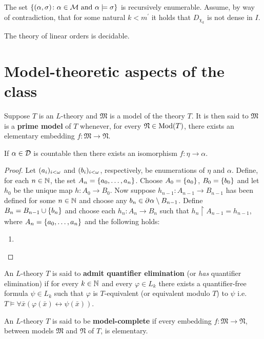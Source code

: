 \begin{lem}
	The set $\lbrace (\alpha,\sigma)\colon \alpha\in\mathcal{M}\text{ and }\alpha\models\sigma \rbrace$ is recursively enumerable.  Assume, by way of contradiction, that for some natural $k<m^\prime$ it holds that $D_{\chi_k}$ is not dense in $I$.
\end{lem}

\begin{thm}
	The theory of linear orders is decidable.
\end{thm}


\section{Model-theoretic aspects of the class \text{$\dense$}}

\begin{dfn}
	Suppose $T$ is an $L$-theory and $\mathfrak{M}$ is a model of the theory $T$. It is then said to $\mathfrak{M}$ is a \textbf{prime model} of $T$ whenever, for every $\mathfrak{N}\in\operatorname{Mod}(T)$, there exists an elementary embedding $f\colon\mathfrak{M}\to\mathfrak{N}$.
\end{dfn}

\begin{thm}
	If $\alpha\in\mathcal{D}$ is countable then there exists an isomorphism $f\colon\eta\to\alpha$.
\end{thm}
\begin{proof}
	Let $(a_i)_{i<\omega}$ and $(b_i)_{i<\omega}$, respectively, be enumerations of $\eta$ and $\alpha$.  Define, for each $n\in\mathbb{N}$, the set $A_n=\lbrace a_0,\dotsc,a_n\rbrace$.  Choose $A_0=\lbrace a_0\rbrace$, $B_0=\lbrace b_0\rbrace$ and let $h_0$ be the unique map $h\colon A_0\to B_0$.  Now suppose $h_{n-1}\colon A_{n-1}\to B_{n-1}$ has been defined for some $n\in\mathbb{N}$ and choose any $b_n\in\partial^{}\alpha\setminus B_{n-1}$.  Define $B_n=B_{n-1}\cup\lbrace b_n\rbrace$ and choose each $h_n\colon A_n\to B_n$ such that $h_n\restriction A_{n-1}=h_{n-1}$, where $A_n=\lbrace a_0,\dotsc,a_n\rbrace$ and the following holds:
	\begin{enumerate}
		\item
	\end{enumerate}
\end{proof}

\begin{dfn}
	An $L$-theory $T$ is said to \textbf{admit quantifier elimination} (or \textit{has} quantifier elimination) if for every $k\in\mathbb{N}$ and every $\varphi\in L_k$ there exists a quantifier-free formula $\psi\in L_k$ such that $\varphi$ is $T$-equivalent (or equivalent modulo $T$) to $\psi$ i.e.\ $T\models\forall\bar{x}(\varphi(\bar{x})\leftrightarrow\psi(\bar{x}))$.
\end{dfn}

\begin{dfn}
	An $L$-theory $T$ is said to be \textbf{model-complete} if every embedding $f\colon\mathfrak{M}\to\mathfrak{N}$, between models $\mathfrak{M}$ and $\mathfrak{N}$ of $T$, is elementary.
\end{dfn}
